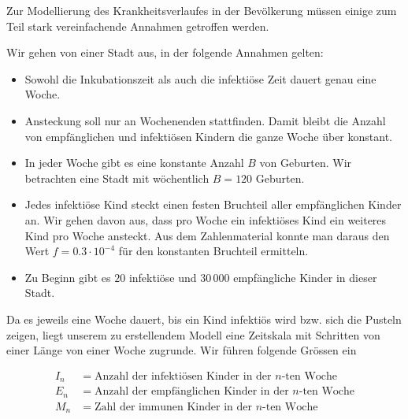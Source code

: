\documentclass[%
11pt,%
twoside,%
titlepage,%
german,%
headsepline%
]{scrartcl}
\begin{document}
\begin{center}
\end{center}

Zur Modellierung des Krankheitsverlaufes in der Bevölkerung müssen einige zum Teil stark vereinfachende Annahmen getroffen werden.

Wir gehen von einer Stadt aus, in der folgende Annahmen gelten:

\begin{itemize}
\item Sowohl die Inkubationszeit als auch die infektiöse Zeit dauert genau eine Woche.
\item Ansteckung soll nur an Wochenenden stattfinden. Damit bleibt die Anzahl von empfänglichen und infektiösen Kindern die ganze Woche über konstant.
\item In jeder Woche gibt es eine konstante Anzahl $B$ von Geburten. Wir betrachten eine Stadt mit wöchentlich $B=120$ Geburten.
\item Jedes infektiöse Kind steckt einen festen Bruchteil aller empfänglichen Kinder an. Wir gehen davon aus, dass pro Woche ein infektiöses Kind ein weiteres Kind pro Woche ansteckt. Aus dem Zahlenmaterial konnte man daraus den Wert $f=0.3\cdot10^{-4}$ für den konstanten Bruchteil ermitteln.
\item Zu Beginn gibt es $20$ infektiöse und $30\,000$ empfängliche Kinder in dieser
Stadt.
\end{itemize}

Da es jeweils eine Woche dauert, bis ein Kind infektiös wird bzw. sich die Pusteln zeigen, liegt unserem zu erstellendem Modell eine Zeitskala mit Schritten von einer Länge von einer Woche zugrunde. Wir führen folgende Grössen ein

\begin{align*}
I_n &= \text{Anzahl der infektiösen Kinder in der $n$-ten Woche}\\
E_n &= \text{Anzahl der empfänglichen Kinder in der $n$-ten Woche}\\
M_n &= \text{Zahl der immunen Kinder in der $n$-ten Woche}\\
\end{align*}
\end{document}
